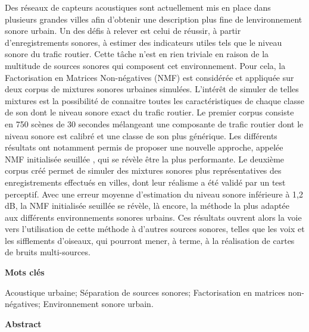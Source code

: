 \begin{cover}
\begin{multicols}{2}
	{\small \begin{spacing}{1.0} Des réseaux de capteurs acoustiques sont actuellement mis en place dans plusieurs grandes villes afin d'obtenir une description plus fine de lenvironnement sonore urbain. Un des défis à relever est celui de réussir, à partir d'enregistrements sonores, à estimer des indicateurs utiles tels que le niveau sonore du trafic routier. Cette tâche n'est en rien triviale en raison de la multitude de sources sonores qui composent cet environnement. Pour cela, la Factorisation en Matrices Non-négatives (NMF) est considérée et appliquée sur deux corpus de mixtures sonores urbaines simulées. L'intérêt de simuler de telles mixtures est la possibilité de connaitre toutes les caractéristiques de chaque classe de son dont le niveau sonore exact du trafic routier. 
Le premier corpus consiste en 750 scènes de 30 secondes mélangeant une composante de trafic routier dont le niveau sonore est calibré et une classe de son plus générique. Les différents résultats ont notamment permis de proposer une nouvelle approche, appelée \og NMF initialisée seuillée \fg{}, qui se révèle être la plus performante. Le deuxième corpus créé  permet de simuler des mixtures sonores plus représentatives des enregistrements effectués en villes, dont leur réalisme a été validé par un test perceptif. Avec une erreur moyenne d'estimation du niveau sonore inférieure à 1,2 dB, la NMF initialisée seuillée se révèle, là encore, la méthode la plus adaptée aux différents environnements sonores urbains.  
Ces résultats ouvrent alors la voie vers l'utilisation de cette méthode à d'autres sources sonores, telles que les voix et les sifflements d'oiseaux, qui pourront mener, à terme, à la réalisation de cartes de bruits multi-sources.
\end{spacing}}
    
    
    \noindent 
	\bigskip
	
    \noindent
    \textbf{Mots clés}
    \smallskip

\begin{spacing}{1.2}
\noindent
Acoustique urbaine; Séparation de sources sonores; Factorisation en matrices non-négatives; Environnement sonore urbain.\end{spacing}
    \columnbreak

    \noindent\textbf{\large Abstract}
    \medskip
	

\end{multicols}
\end{cover}
